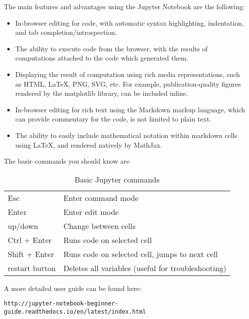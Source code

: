 \noindent The main features and advantages using the Jupyter Notebook are the
following:

\begin{itemize}

\item In-browser editing for code, with automatic syntax highlighting, indentation, and tab completion/introspection.

\item The ability to execute code from the browser, with the results of computations attached to the code which generated them.

\item Displaying the result of computation using rich media representations, such as HTML, LaTeX, PNG, SVG, etc. For example, publication-quality figures rendered by the matplotlib library, can be included inline.

\item In-browser editing for rich text using the Markdown markup language, which can provide commentary for the code, is not limited to plain text.

\item The ability to easily include mathematical notation within markdown cells using LaTeX, and rendered natively by MathJax.

\end{itemize}

\noindent The basic commands you should know are

\begin{table}[!h]
\begin{center}
\begin{tabular}{|l|l|}
\hline
Esc              & Enter command mode\\
Enter            & Enter edit mode\\
\hline
up/down          & Change between cells\\
Ctrl + Enter     & Runs code on selected cell\\
Shift + Enter    & Runs code on selected cell, jumps to next cell\\
\hline
restart button   & Deletes all variables (useful for troubleshooting)\\ 
\hline
\end{tabular}
\end{center}
\caption{\label{tb::jupyterbasiccommands}Basic Jupyter commands}
\end{table}

\noindent A more detailed user guide can be found here:

\begin{verbatim}
http://jupyter-notebook-beginner-guide.readthedocs.io/en/latest/index.html
\end{verbatim}
